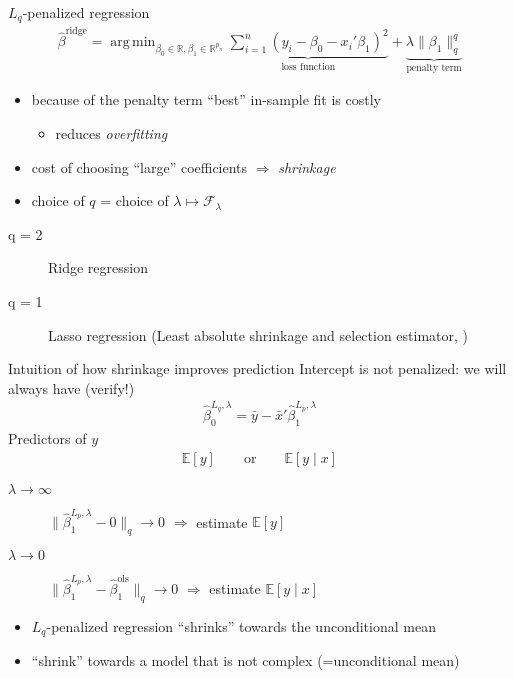 \documentclass[xcolor=dvipsnames, handout]{beamer}
\newcommand{\E}{\mathbb{E}}
\DeclareMathOperator{\argmin}{arg\,min}
\begin{document}
\begin{frame}{$L_q$-penalized regression}
\begin{align*}
  \hat{\beta}^{\text{ridge}} = \argmin_{\beta_0 \in \mathbb{R}, \beta_1 \in \mathbb{R}^{p_n}} \underbrace{\sum_{i=1}^n \left(y_i - \beta_0 - x_i'\beta_1\right)^2}_{\text{loss function}} + \underbrace{\lambda \lVert \beta_1 \rVert_q^q}_{\text{penalty term}} 
\end{align*}
\begin{itemize}[<+->]
  \item because of the penalty term ``best'' in-sample fit is costly
  \begin{itemize}
    \item reduces \emph{overfitting}
  \end{itemize}
  \item cost of choosing ``large'' coefficients $\Rightarrow$ \emph{shrinkage}
  \item choice of $q$ = choice of $\lambda \mapsto \mathcal{F}_{\lambda}$
\end{itemize}
\pause
\begin{description}
\item[q = 2] Ridge regression
\item[q = 1] Lasso regression (Least absolute shrinkage and selection estimator, \cite{tibshirani1996regression})
\end{description}
\end{frame}


\begin{frame}{Intuition of how shrinkage improves prediction}
Intercept is not penalized: we will always have (verify!)
\begin{align*}
\hat{\beta}_0^{L_q, \lambda} = \bar{y} - \bar{x}'\hat{\beta}_1^{L_p, \lambda} 
\end{align*}
Predictors of $y$
\begin{align*}
  \E [y] \qquad \text{or} \qquad \E[y \mid x]
\end{align*}
\pause 
\begin{description}
\item[$\lambda \to \infty$] $\lVert \hat{\beta}_1^{L_p, \lambda} - 0 \rVert_q \to 0 $ $\Rightarrow$ estimate $\E[y]$
\item[$\lambda \to 0$] $\lVert \hat{\beta}_1^{L_p, \lambda} - \hat{\beta}_1^{\text{ols}} \rVert_q \to 0 $ $\Rightarrow$ estimate $\E[y \mid x]$
\end{description}
\begin{itemize}[<+->]
  \item $L_q$-penalized regression ``shrinks'' towards the unconditional mean
  \item ``shrink'' towards a model that is not complex (=unconditional mean)
\end{itemize}
\end{frame}
\end{document}
